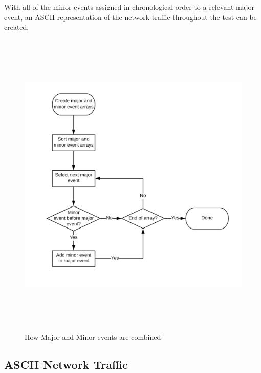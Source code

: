 With all of the minor events assigned in chronological order to a relevant major event, an ASCII representation of the network traffic throughout the test can be created.

\begin{figure}
    \begin{centering}
        \includegraphics[width=15cm,height=15cm,keepaspectratio]{Figures/Chapter5-CombiningMajorMinor.png}
        \caption{How Major and Minor events are combined}
        \label{fig:chapter5CombineMajorMinor}
    \end{centering}
\end{figure}

\subsection{ASCII Network Traffic}

